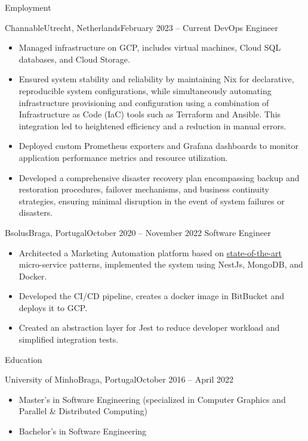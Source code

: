 \documentclass[]{mcdowellcv}
\begin{document}
	\makeheader

	\begin{cvsection}{Employment}
 		\begin{cvsubsection}{Channable}{Utrecht, Netherlands}{February 2023 -- Current}
			DevOps Engineer
			\begin{itemize}
                \item Managed infrastructure on GCP, includes virtual machines, Cloud SQL databases, and Cloud Storage. 
                \item Ensured system stability and reliability by maintaining Nix for declarative, reproducible system configurations, while simultaneously automating infrastructure provisioning and configuration using a combination of Infrastructure as Code (IaC) tools such as Terraform and Ansible. This integration led to heightened efficiency and a reduction in manual errors.
                \item Deployed custom Prometheus exporters and Grafana dashboards to monitor application performance metrics and resource utilization.
                \item Developed a comprehensive disaster recovery plan encompassing backup and restoration procedures, failover mechanisms, and business continuity strategies, ensuring minimal disruption in the event of system failures or disasters.
			\end{itemize}
		\end{cvsubsection}
		\begin{cvsubsection}{Bsolus}{Braga, Portugal}{October 2020 -- November 2022}
			Software Engineer
			\begin{itemize}
                \item Architected a Marketing Automation platform based on \href{https://repositorium.sdum.uminho.pt/handle/1822/80045}{\underline{state-of-the-art}} micro-service patterns, implemented the system using NestJs, MongoDB, and Docker.
                \item Developed the CI/CD pipeline, creates a docker image in BitBucket and deploys it to GCP.
                \item Created an abstraction layer for Jest to reduce developer workload and simplified integration tests.
			\end{itemize}
		\end{cvsubsection}
	\end{cvsection}

    \begin{cvsection}{Education}
		\begin{cvsubsection}{University of Minho}{Braga, Portugal}{October 2016 -- April 2022}
			\begin{itemize}
                \item Master’s in Software Engineering (specialized in Computer Graphics and Parallel \& Distributed Computing)
                \item Bachelor's in Software Engineering
			\end{itemize}
		\end{cvsubsection}
	\end{cvsection}
\end{document}
